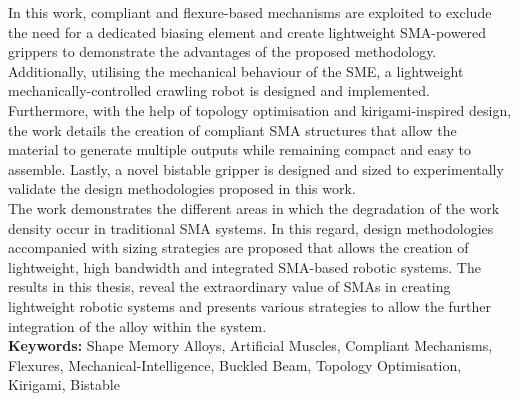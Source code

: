 In this work, compliant and flexure-based mechanisms are exploited to exclude the need for a dedicated biasing element and create lightweight SMA-powered grippers to demonstrate the advantages of the proposed methodology. Additionally, utilising the mechanical behaviour of the SME, a lightweight mechanically-controlled crawling robot is designed and implemented. Furthermore, with the help of topology optimisation and kirigami-inspired design, the work details the creation of compliant SMA structures that allow the material to generate multiple outputs while remaining compact and easy to assemble. Lastly, a novel bistable gripper is designed and sized to experimentally validate the design methodologies proposed in this work.\\

The work demonstrates the different areas in which the degradation of the work density occur in traditional SMA systems. In this regard, design methodologies accompanied with sizing strategies are proposed that allows the creation of lightweight, high bandwidth and integrated SMA-based robotic systems. The results in this thesis, reveal the extraordinary value of SMAs in creating lightweight robotic systems and presents various strategies to allow the further integration of the alloy within the system.\\

\textbf{Keywords:} Shape Memory Alloys, Artificial Muscles, Compliant Mechanisms, Flexures, Mechanical-Intelligence, Buckled Beam, Topology Optimisation, Kirigami, Bistable

